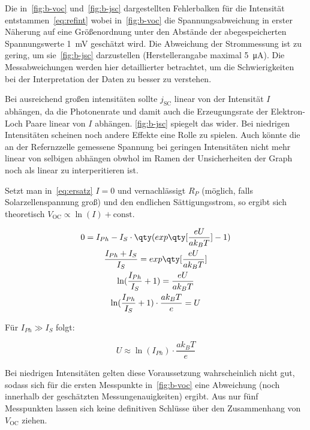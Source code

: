 \documentclass[slug=SZ, room=Hermann-Krone-Bau\,\ Labor\ 1.25,
supervisor=Martin\ Kroll, coursedate=14.\ 11.\ 2019]{../../Lab_Report_LaTeX/lab_report}
\newcommand{\voc}{V_{\text{OC}}}
\newcommand{\jsc}{j_{\text{SC}}}
\begin{document}
Die in~\ref{fig:b-voc} und~\ref{fig:b-jsc} dargestellten Fehlerbalken
f\"ur die Intensit\"at entstammen~\ref{eq:refint} wobei
in~\ref{fig:b-voc} die Spannungsabweichung in erster N\"aherung auf
eine Gr\"o\ss{}enordnung unter den Abst\"ande der abegespeicherten
Spannungswerte \SI{1}{\milli\volt} gesch\"atzt wird. Die Abweichung
der Strommessung ist zu gering, um sie~\ref{fig:b-jsc} darzustellen
(Herstellerangabe maximal \SI{5}{\micro\ampere}). Die Messabweichungen
werden hier detaillierter betrachtet, um die Schwierigkeiten bei der
Interpretation der Daten zu besser zu verstehen.

Bei ausreichend gro\ss{}en intensit\"aten sollte \(\jsc\) linear von
der Intensit\"at \(I\) abh\"angen, da die Photonenrate und damit auch
die Erzeugungsrate der Elektron-Loch Paare linear von \(I\)
abh\"angen. \ref{fig:b-jsc} spiegelt das wider. Bei niedrigen
Intensit\"aten scheinen noch andere Effekte eine Rolle zu
spielen. Auch k\"onnte die an der Refernzzelle gemessene Spannung bei
geringen Intensit\"aten nicht mehr linear von selbigen abh\"angen
obwhol im Ramen der Unsicherheiten der Graph noch als linear zu
interperitieren ist.

Setzt man in~\ref{eq:ersatz} \(I=0\) und vernachl\"assigt \(R_P\)
(m\"oglich, falls Solarzellenspannung gro\ss{}) und den endlichen
S\"attigungsstrom, so ergibt sich theoretisch
\(\voc\propto\ln(I) + \text{const}\).

\begin{gather}
0  = I_{Ph} - I_S \cdot \qty(exp\qty[\frac{eU}{ak_BT}]-1)\\
\frac{I_{Ph}+I_S}{I_S} = exp\qty[\frac{eU}{ak_BT}]\\
\ln(\frac{I_{Ph}}{I_S}+1) = \frac{eU}{ak_BT}\\
\ln(\frac{I_{Ph}}{I_S}+1) \cdot \frac{ak_BT}{e} = U \label{eq:shocknachu}
\end{gather}

Für \(I_{Ph} \gg I_S\) folgt:

\begin{equation}\label{eq:iphgross}
          U \approx \ln(I_{Ph}) \cdot \frac{ak_BT}{e}
\end{equation}

Bei niedrigen
Intensit\"aten gelten diese Voraussetzung wahrscheinlich nicht gut,
sodass sich f\"ur die ersten Messpunkte in~\ref{fig:b-voc} eine
Abweichung (noch innerhalb der gesch\"atzten Messungenauigkeiten)
ergibt. Aus nur f\"unf Messpunkten lassen sich keine definitiven
Schl\"usse \"uber den Zusammenhang von \(\voc\) ziehen.
\end{document}
